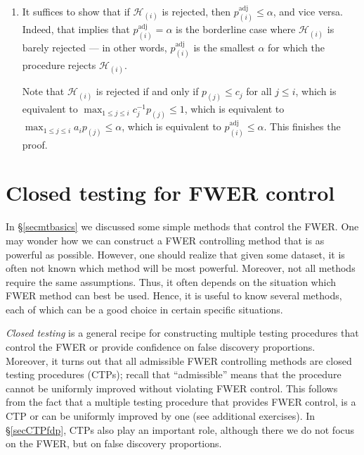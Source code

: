 \documentclass[11pt]{article}
\theoremstyle{plain}
\theoremstyle{definition}
\newcommand{\Hy}{\mathcal{H}}
\begin{document}
\begin{sols}
\begin{enumerate}
Note that if all hypotheses are true and all p-values are standard uniform, we get an equality: $\mathbb{E}(V) = \alpha$. In that setting (i.e. $m=N$ and all p-values standard uniform) Holm always rejects the hypotheses that Bonferroni rejects, and sometimes more (since Holm uses larger critical values $c_i$ than Bonferroni). Hence,  it then holds that $\mathbb{E}(V) > \alpha$ for Holm.

\item
It suffices to show that if $\Hy_{(i)}$ is rejected, then $p^{\text{adj}}_{(i)}\leq \alpha$, and vice versa. Indeed, that implies that $p^{\text{adj}}_{(i)}= \alpha$ is the borderline case where  $\Hy_{(i)} $ is barely rejected --- in other words, $p^{\text{adj}}_{(i)}$ is the smallest $\alpha$ for which the procedure rejects $\Hy_{(i)} $.


Note that $\Hy_{(i)}$ is rejected if and only if $p_{(j)}\leq c_j$ for all $j\leq i$, which is equivalent to 
$\max_{1\leq j \leq i}c_j^{-1}p_{(j)}\leq 1$, which is equivalent to $\max_{1\leq j \leq i}a_i p_{(j)}\leq \alpha $, which is equivalent to $p^{\text{adj}}_{(i)}\leq \alpha.$ This finishes the proof.


\end{enumerate}

\end{sols}

\newpage

\section{Closed testing for FWER control} \label{secCT}
In \S\ref{secmtbasics} we discussed some simple methods that control the FWER. One may wonder how we can construct a FWER controlling method that is as powerful as possible. However, one should realize that given some dataset, it is often not known which method will be most powerful. Moreover, not all methods require the same assumptions.
Thus, it often depends on the situation which FWER method can best be used.
Hence, it is useful to know several methods, each of which can be a good choice in certain specific situations.

\emph{Closed testing} is a general recipe for constructing multiple testing procedures that control the FWER or provide confidence on false discovery proportions. Moreover, it turns out that all admissible FWER controlling methods are closed testing procedures (CTPs); recall that ``admissible'' means that the procedure cannot be uniformly improved without violating FWER control. This follows from the fact that a multiple testing procedure that provides FWER control,  is a CTP or can be uniformly improved by one (see additional exercises).
In \S\ref{secCTPfdp}, CTPs also play an important role, although there we do not focus on the FWER, but on false discovery proportions.
\end{document}
